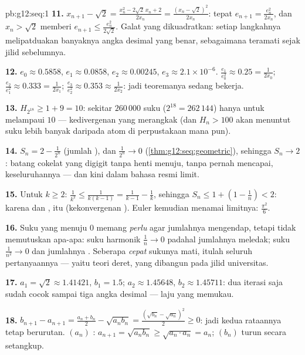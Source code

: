 \begin{solution}{pb:g12:seq:1}
\textbf{11.} $x_{n+1} - \sqrt2 = \frac{x_n^2 - 2\sqrt2\,x_n +
2}{2x_n} = \frac{(x_n - \sqrt2)^2}{2x_n}$: tepat
$e_{n+1} = \frac{e_n^2}{2x_n}$, dan $x_n > \sqrt2$ memberi
$e_{n+1} \leq \frac{e_n^2}{2\sqrt2}$. Galat yang dikuadratkan: setiap
langkahnya melipatduakan banyaknya angka desimal yang benar, sebagaimana
teramati sejak jilid sebelumnya.

\textbf{12.} $e_0 \approx 0.5858$, $e_1 \approx 0.0858$,
$e_2 \approx 0.00245$, $e_3 \approx 2.1 \times 10^{-6}$.
 $\frac{e_1}{e_0^2} \approx 0.25 = \frac{1}{2x_0}$;
$\frac{e_2}{e_1^2} \approx 0.333 = \frac{1}{2x_1}$;
$\frac{e_3}{e_2^2} \approx 0.353 \approx \frac{1}{2x_2}$: jadi
teoremanya sedang bekerja.

\textbf{13.} $H_{2^{18}} \geq 1 + 9 = 10$: sekitar
$260\,000$ suku ($2^{18} = 262\,144$) hanya untuk melampaui $10$ ---
kedivergenan yang merangkak (dan $H_n > 100$ akan menuntut suku lebih banyak
daripada atom di perpustakaan mana pun).

\textbf{14.} $S_n = 2 - \frac{1}{2^n}$ (jumlah ), dan
$\frac{1}{2^n} \to 0$ (\cref{thm:g12:seq:geometric}), sehingga
$S_n \to 2$: batang cokelat yang digigit tanpa henti menuju,
tanpa pernah mencapai, keseluruhannya --- dan kini dalam bahasa
resmi limit.

\textbf{15.} Untuk $k \geq 2$:
$\frac{1}{k^2} \leq \frac{1}{k(k-1)} = \frac{1}{k-1} -
\frac1k$, sehingga
$S_n \leq 1 + \left(1 - \frac1n\right) < 2$: karena  dan
,  itu  (kekonvergenan ). Euler
kemudian menamai limitnya: $\frac{\pi^2}{6}$.

\textbf{16.} Suku yang menuju $0$ memang \emph{perlu} agar
jumlahnya mengendap, tetapi tidak memutuskan apa-apa: suku harmonik
$\frac1n \to 0$ padahal jumlahnya meledak; suku
$\frac{1}{n^2} \to 0$ dan jumlahnya . Seberapa \emph{cepat}
sukunya mati, itulah seluruh pertanyaannya --- yaitu teori deret,
yang dibangun pada jilid universitas.

\textbf{17.} $a_1 = \sqrt2 \approx 1.41421$, $b_1 = 1.5$;
$a_2 \approx 1.45648$, $b_2 \approx 1.45711$: dua iterasi saja
sudah cocok sampai tiga angka desimal --- laju yang memukau.

\textbf{18.} $b_{n+1} - a_{n+1} = \frac{a_n + b_n}{2} -
\sqrt{a_n b_n} = \frac{(\sqrt{b_n} - \sqrt{a_n})^2}{2} \geq
0$: jadi kedua rataannya tetap berurutan. $(a_n)$ :
$a_{n+1} = \sqrt{a_n b_n} \geq \sqrt{a_n \cdot a_n} = a_n$;
$(b_n)$ turun secara setangkup.


\end{solution}
